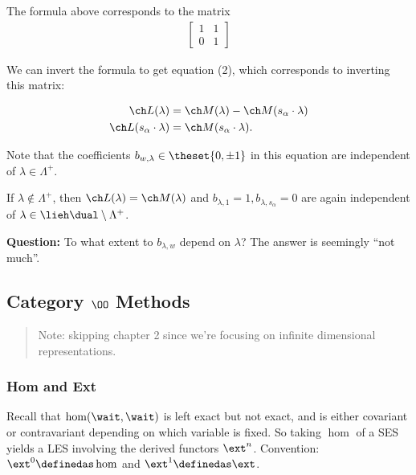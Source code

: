 The formula above corresponds to the matrix
\begin{align*}
\left[\begin{array}{cc} 1 & 1 \\ 0 & 1 \end{array}\right]
\end{align*}

We can invert the formula to get equation (2), which corresponds to
inverting this matrix:

\begin{align*}
\ch L(\lambda) &= \ch M(\lambda) - \ch M(s_\alpha \cdot \lambda) \\
\ch L(s_\alpha \cdot \lambda) &= \ch M(s_\alpha \cdot \lambda)
.\end{align*}

Note that the coefficients \(b_{w, \lambda} \in \theset{0, \pm 1}\) in
this equation are independent of \(\lambda \in \Lambda^+\).

If \(\lambda \not\in\Lambda^+\), then
\(\ch L(\lambda) = \ch M(\lambda)\) and
\(b_{\lambda, 1} = 1, b_{\lambda, s_\alpha} = 0\) are again independent
of \(\lambda \in \lieh\dual \setminus \Lambda^+\).

\textbf{Question:} To what extent to \(b_{\lambda, w}\) depend on
\(\lambda\)? The answer is seemingly ``not much''.

\hypertarget{category-oo-methods}{%
\subsection{\texorpdfstring{Category \(\OO\)
Methods}{Category \textbackslash OO Methods}}\label{category-oo-methods}}

\begin{quote}
Note: skipping chapter 2 since we're focusing on infinite dimensional
representations.
\end{quote}

\hypertarget{hom-and-ext}{%
\subsubsection{Hom and Ext}\label{hom-and-ext}}

Recall that \(\hom(\wait, \wait)\) is left exact but not exact, and is
either covariant or contravariant depending on which variable is fixed.
So taking \(\hom\) of a SES yields a LES involving the derived functors
\(\ext^n\). Convention: \(\ext^0 \definedas \hom\) and
\(\ext^1 \definedas \ext\).

